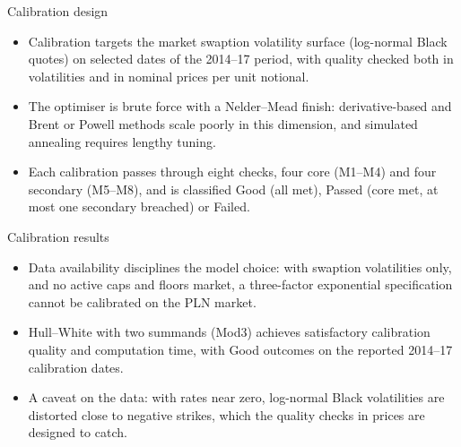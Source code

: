 \documentclass[aspectratio=169,11pt]{beamer}
\begin{document}
\begin{frame}{Calibration design}
  \begin{itemize}
    \item Calibration targets the market swaption volatility surface
          (log-normal Black quotes) on selected dates of the 2014--17
          period, with quality checked both in volatilities and in nominal
          prices per unit notional.
    \item The optimiser is brute force with a Nelder--Mead finish:
          derivative-based and Brent or Powell methods scale poorly in this
          dimension, and simulated annealing requires lengthy tuning.
    \item Each calibration passes through eight checks, four core (M1--M4)
          and four secondary (M5--M8), and is classified Good (all met),
          Passed (core met, at most one secondary breached) or Failed.
  \end{itemize}
\end{frame}

\begin{frame}{Calibration results}
  \begin{itemize}
    \item Data availability disciplines the model choice: with swaption
          volatilities only, and no active caps and floors market, a
          three-factor exponential specification cannot be calibrated on
          the PLN market.
    \item Hull--White with two summands (Mod3) achieves satisfactory
          calibration quality and computation time, with Good outcomes on
          the reported 2014--17 calibration dates.
    \item A caveat on the data: with rates near zero, log-normal Black
          volatilities are distorted close to negative strikes, which the
          quality checks in prices are designed to catch.
  \end{itemize}
\end{frame}
\end{document}
